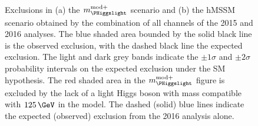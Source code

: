 \begin{figure}[h!]
\begin{center}
~\\
\end{center}
\caption[Exclusions in the $m_{\PHiggslight}^{\text{mod+}}$ scenario and the hMSSM
scenario of the combination of the 2015 and 2016 \AHtotautau analyses.]{Exclusions in (a) the $m_{\PHiggslight}^{\text{mod}+}$ scenario and (b) the hMSSM scenario 
obtained by the combination
of all channels of the 2015 and 2016 \AHtotautau analyses. The blue shaded area bounded by the 
solid black line is the observed exclusion, with the dashed black line the
expected exclusion. The light and dark grey bands indicate
the $\pm 1\sigma$ and $\pm 2\sigma$ probability intervals on the expected exclusion under the \ac{SM} hypothesis.
The red shaded area in the $m_{\PHiggslight}^{\text{mod}+}$ figure
is excluded by the lack of a light Higgs boson with mass compatible with $125\,\GeV$ in the model. The dashed (solid)
blue lines indicate the expected (observed) exclusion from the 2016 analysis alone.}
\label{fig:mssm_mhmodp_20152016}
\end{figure}





